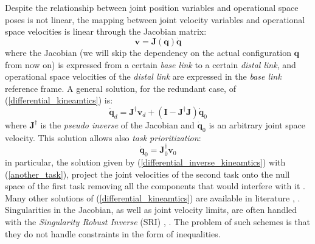 Despite the relationship between joint position variables and operational space poses is not linear, the mapping between joint velocity variables and operational space velocities is linear through the Jacobian matrix:
\begin{equation}
    \label{differential_kineamtics}
    \mathbf{v} = \mathbf{J}(\mathbf{q})\mathbf{\dot{q}}
\end{equation}
where the Jacobian (we will skip the dependency on the actual configuration $\mathbf{q}$ from now on) is expressed from a certain \emph{base link} to a certain \emph{distal link}, and operational space velocities of the \emph{distal link} are expressed in the \emph{base link} reference frame.
A general solution, for the redundant case, of (\ref{differential_kineamtics}) is:
\begin{equation}
    \label{differential_inverse_kineamtics}
    \mathbf{\dot{q}}_d = \mathbf{J}^{\dagger}\mathbf{v}_d + \left( \mathbf{I} - \mathbf{J}^{\dagger}\mathbf{J} \right)\mathbf{\dot{q}}_0
\end{equation}
where $\mathbf{J}^{\dagger}$ is the \emph{pseudo inverse} of the Jacobian and $\dot{\mathbf{q}}_0$ is an arbitrary joint space velocity. 
This solution allows also \emph{task prioritization}: 
\begin{equation}
    \label{another_task}
\mathbf{\dot{q}}_0 = \mathbf{J}_0^{\dagger}\mathbf{v}_0
\end{equation}
in particular, the solution given by (\ref{differential_inverse_kineamtics}) with (\ref{another_task}), project the joint velocities of the second task onto the null space of the first task removing all the components that would interfere with it \cite{SicilianoKathib:08}. Many other solutions of (\ref{differential_kineamtics}) are available in literature \cite{Siciliano:91}, \cite{Flacco:14}. Singularities in the Jacobian, as well as joint velocity limits, are often handled with the \emph{Singularity Robust Inverse} (SRI) \cite{Nakamura:90}, \cite{Maciejewski:89}.
The problem of such schemes is that they do not handle constraints in the form of inequalities. 

